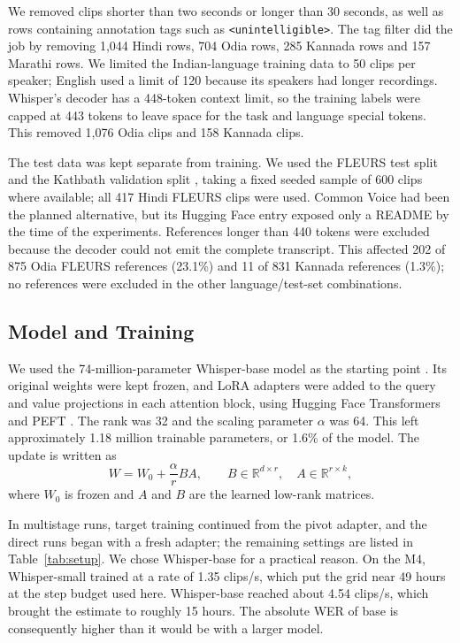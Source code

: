 \documentclass[conference]{IEEEtran}
\begin{document}
We removed clips shorter than two seconds or longer than 30 seconds, as well as rows containing annotation tags such as \texttt{<unintelligible>}. The tag filter did the job by removing 1,044 Hindi rows, 704 Odia rows, 285 Kannada rows and 157 Marathi rows. We limited the Indian-language training data to 50 clips per speaker; English used a limit of 120 because its speakers had longer recordings. Whisper's decoder has a 448-token context limit, so the training labels were capped at 443 tokens to leave space for the task and language special tokens. This removed 1,076 Odia clips and 158 Kannada clips.

The test data was kept separate from training. We used the FLEURS test
split \cite{conneau2023fleurs} and the Kathbath validation split
\cite{javed2023indicsuperb}, taking a fixed seeded sample of 600 clips
where available; all 417 Hindi FLEURS clips were used. Common Voice
\cite{ardila2020commonvoice} had been the planned alternative, but its
Hugging Face entry exposed only a README by the time of the experiments.
References longer than 440 tokens were excluded because the decoder
could not emit the complete transcript. This affected 202 of 875 Odia
FLEURS references (23.1\%) and 11 of 831 Kannada references (1.3\%); no
references were excluded in the other language/test-set combinations.

\subsection{Model and Training}

We used the 74-million-parameter Whisper-base model as the starting
point \cite{radford2023whisper}. Its original weights were kept frozen, and
LoRA adapters \cite{hu2022lora} were added to the query and value
projections in each attention block, using Hugging Face Transformers
\cite{wolf2020transformers} and PEFT \cite{peft2022}. The rank was 32
and the scaling parameter $\alpha$ was 64. This left approximately 1.18
million trainable parameters, or 1.6\% of the model. The update is
written as
\begin{equation}
W = W_0 + \frac{\alpha}{r}BA, \qquad
B \in \mathbb{R}^{d\times r},\quad A \in \mathbb{R}^{r\times k},
\label{eq:lora}
\end{equation}
where $W_0$ is frozen and $A$ and $B$ are the learned low-rank matrices.

In multistage runs, target training continued from the pivot adapter, and the direct runs began with a fresh adapter; the remaining settings are listed in Table~\ref{tab:setup}. We chose Whisper-base for a practical reason. On the M4, Whisper-small trained at a rate of 1.35 clips/s, which put the grid near 49 hours at the step budget used here. Whisper-base reached about 4.54 clips/s, which brought the estimate to roughly 15 hours. The absolute WER of base is consequently higher than it would be with a larger model.
\end{document}
